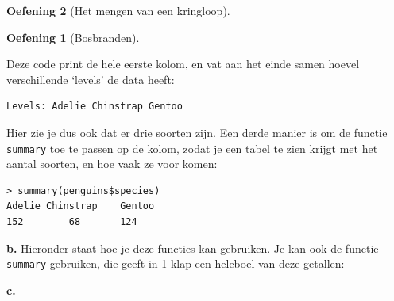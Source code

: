 \documentclass[
  a4paper,
]{scrbook}
\newenvironment{Shaded}{\begin{snugshade}}{\end{snugshade}}
\newcommand{\AttributeTok}[1]{\textcolor[rgb]{0.40,0.45,0.13}{#1}}
\newcommand{\CommentTok}[1]{\textcolor[rgb]{0.37,0.37,0.37}{#1}}
\newcommand{\DecValTok}[1]{\textcolor[rgb]{0.68,0.00,0.00}{#1}}
\newcommand{\FunctionTok}[1]{\textcolor[rgb]{0.28,0.35,0.67}{#1}}
\newcommand{\NormalTok}[1]{\textcolor[rgb]{0.00,0.23,0.31}{#1}}
\newcommand{\OtherTok}[1]{\textcolor[rgb]{0.00,0.23,0.31}{#1}}
\newcommand{\SpecialCharTok}[1]{\textcolor[rgb]{0.37,0.37,0.37}{#1}}
\theoremstyle{definition}
\newtheorem{exercise}{Oefening}[chapter]
\theoremstyle{remark}
\begin{document}
\begin{exercise}[Het mengen van een
kringloop]
\begin{exercise}[Bosbranden]
\begin{Shaded}
\end{Shaded}

Deze code print de hele eerste kolom, en vat aan het einde samen hoevel
verschillende `levels' de data heeft:

\begin{verbatim}
Levels: Adelie Chinstrap Gentoo
\end{verbatim}

Hier zie je dus ook dat er drie soorten zijn. Een derde manier is om de
functie \texttt{summary} toe te passen op de kolom, zodat je een tabel
te zien krijgt met het aantal soorten, en hoe vaak ze voor komen:

\begin{verbatim}
> summary(penguins$species)
Adelie Chinstrap    Gentoo 
152        68       124
\end{verbatim}

\textbf{b.} Hieronder staat hoe je deze functies kan gebruiken. Je kan
ook de functie \texttt{summary} gebruiken, die geeft in 1 klap een
heleboel van deze getallen:

\begin{Shaded}
\end{Shaded}

\textbf{c.}

\begin{Shaded}
\end{Shaded}


\end{exercise}
\end{exercise}
\end{document}
